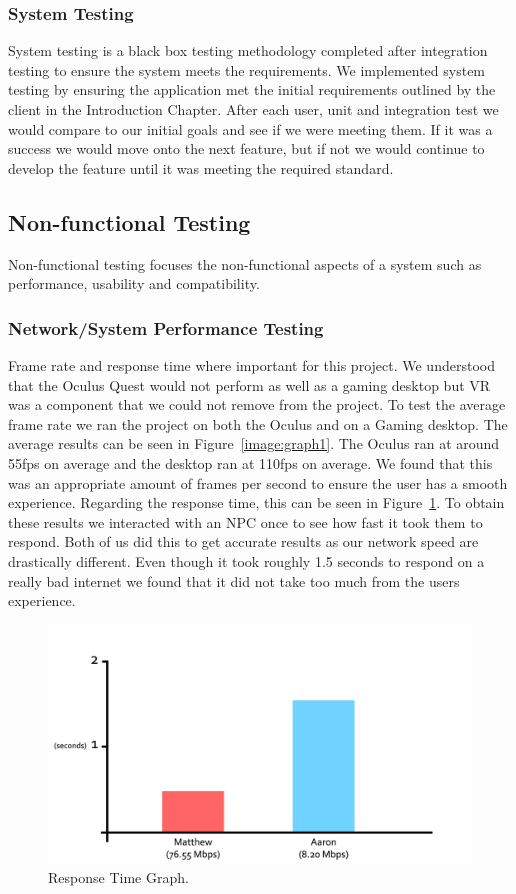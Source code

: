 \subsubsection{System Testing}
System testing is a black box testing methodology completed after integration testing to ensure the system meets the requirements. We implemented system testing by ensuring the application met the initial requirements outlined by the client in the Introduction Chapter. After each user, unit and integration test we would compare to our initial goals and see if we were meeting them. If it was a success we would move onto the next feature, but if not we would continue to develop the feature until it was meeting the required standard.

\subsection{Non-functional Testing}
Non-functional testing focuses the non-functional aspects of a system such as performance, usability and compatibility.

\subsubsection{Network/System Performance Testing}
Frame rate and response time where important for this project. We understood that the Oculus Quest would not perform as well as a gaming desktop but VR was a component that we could not remove from the project. To test the average frame rate we ran the project on both  the Oculus and on a Gaming desktop. The average results can be seen in Figure~\ref{image:graph1}. The Oculus ran at around 55fps on average and the desktop ran at 110fps on average. We found that this was an appropriate amount of frames per second to ensure the user has a smooth experience. Regarding the response time, this can be seen in Figure~\ref{image:graph}. To obtain these results we interacted with an NPC once to see how fast it took them to respond. Both of us did this to get accurate results as our network speed are drastically different. Even though it took roughly 1.5 seconds to respond on a really bad internet we found that it did not take too much from the users experience.

\begin{figure}[h!]
	\caption{Response Time Graph.}
	\label{image:graph}
	\centering
	\includegraphics[width=1\textwidth]{Images/barchart connection.png}
\end{figure}

